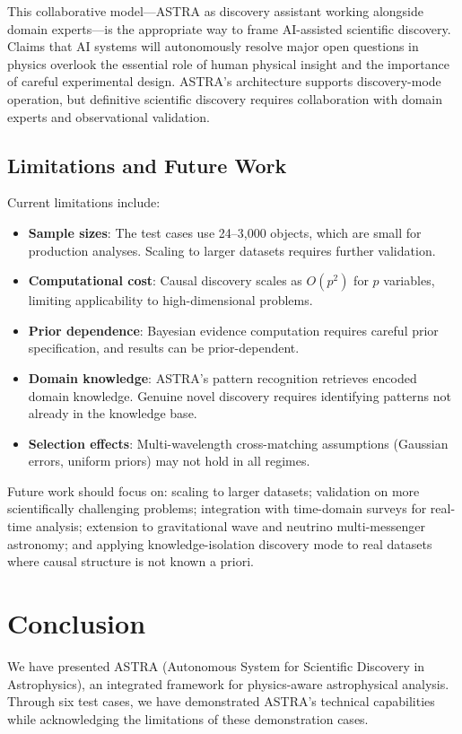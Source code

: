 \documentclass[usenatbib]{rasti}
\begin{document}
This collaborative model---ASTRA as discovery assistant working alongside domain experts---is the appropriate way to frame AI-assisted scientific discovery. Claims that AI systems will autonomously resolve major open questions in physics overlook the essential role of human physical insight and the importance of careful experimental design. ASTRA's architecture supports discovery-mode operation, but definitive scientific discovery requires collaboration with domain experts and observational validation.

\subsection{Limitations and Future Work}

Current limitations include:
\begin{itemize}
\item \textbf{Sample sizes}: The test cases use 24--3,000 objects, which are small for production analyses. Scaling to larger datasets requires further validation.
\item \textbf{Computational cost}: Causal discovery scales as $O(p^2)$ for $p$ variables, limiting applicability to high-dimensional problems.
\item \textbf{Prior dependence}: Bayesian evidence computation requires careful prior specification, and results can be prior-dependent.
\item \textbf{Domain knowledge}: ASTRA's pattern recognition retrieves encoded domain knowledge. Genuine novel discovery requires identifying patterns not already in the knowledge base.
\item \textbf{Selection effects}: Multi-wavelength cross-matching assumptions (Gaussian errors, uniform priors) may not hold in all regimes.
\end{itemize}

Future work should focus on: scaling to larger datasets; validation on more scientifically challenging problems; integration with time-domain surveys for real-time analysis; extension to gravitational wave and neutrino multi-messenger astronomy; and applying knowledge-isolation discovery mode to real datasets where causal structure is not known a priori.

\section{Conclusion}

We have presented ASTRA (Autonomous System for Scientific Discovery in Astrophysics), an integrated framework for physics-aware astrophysical analysis. Through six test cases, we have demonstrated ASTRA's technical capabilities while acknowledging the limitations of these demonstration cases.
\end{document}
